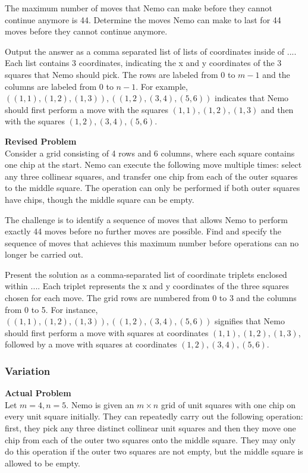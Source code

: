 The maximum number of moves that Nemo can make before they cannot continue anymore is 44. Determine the moves Nemo can make to last for 44 moves before they cannot continue anymore.

Output the answer as a comma separated list of lists of coordinates inside of $\boxed{...}$. Each list contains 3 coordinates, indicating the x and y coordinates of the 3 squares that Nemo should pick. The rows are labeled from $0$ to $m-1$ and the columns are labeled from $0$ to $n-1$. For example, $\boxed{((1,1),(1,2),(1,3)),((1,2),(3,4),(5,6))}$ indicates that Nemo should first perform a move with the squares $(1,1), (1,2), (1,3)$ and then with the squares $(1,2),(3,4),(5,6)$.

\textbf{Revised Problem}\\
Consider a grid consisting of 4 rows and 6 columns, where each square contains one chip at the start. Nemo can execute the following move multiple times: select any three collinear squares, and transfer one chip from each of the outer squares to the middle square. The operation can only be performed if both outer squares have chips, though the middle square can be empty. 

The challenge is to identify a sequence of moves that allows Nemo to perform exactly 44 moves before no further moves are possible. Find and specify the sequence of moves that achieves this maximum number before operations can no longer be carried out.

Present the solution as a comma-separated list of coordinate triplets enclosed within $\boxed{...}$. Each triplet represents the x and y coordinates of the three squares chosen for each move. The grid rows are numbered from 0 to 3 and the columns from 0 to 5. For instance, $\boxed{((1,1),(1,2),(1,3)),((1,2),(3,4),(5,6))}$ signifies that Nemo should first perform a move with squares at coordinates $(1,1), (1,2), (1,3)$, followed by a move with squares at coordinates $(1,2), (3,4), (5,6)$.

\subsubsection{Variation}
\textbf{Actual Problem}\\
Let $m = 4, n = 5$. Nemo is given an $m \times n$ grid of unit squares with one chip on every unit square initially. They can repeatedly carry out the following operation: first, they pick any three distinct collinear unit squares and then they move one chip from each of the outer two squares onto the middle square. They may only do this operation if the outer two squares are not empty, but the middle square is allowed to be empty. 

